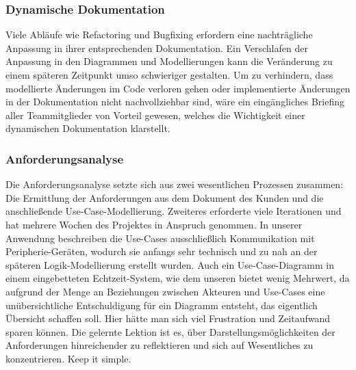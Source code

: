 \subsubsection{Dynamische Dokumentation}
Viele Abläufe wie Refactoring und Bugfixing erfordern eine nachträgliche Anpassung in ihrer entsprechenden
Dokumentation.
Ein Verschlafen der Anpassung in den Diagrammen und Modellierungen kann die Veränderung zu einem
späteren Zeitpunkt umso schwieriger gestalten.
Um zu verhindern, dass modellierte Änderungen im Code verloren gehen oder implementierte Änderungen
in der Dokumentation nicht nachvollziehbar sind, wäre ein eingängliches Briefing aller Teammitglieder von Vorteil
gewesen, welches die Wichtigkeit einer dynamischen Dokumentation klarstellt.

\subsubsection{Anforderungsanalyse}
Die Anforderungsanalyse setzte sich aus zwei wesentlichen Prozessen zusammen:
Die Ermittlung der Anforderungen aus dem Dokument des Kunden und die anschließende Use-Case-Modellierung.
Zweiteres erforderte viele Iterationen und hat mehrere Wochen des Projektes in Anspruch genommen.
In unserer Anwendung beschreiben die Use-Cases ausschließlich Kommunikation mit Peripherie-Geräten,
wodurch sie anfangs sehr technisch und zu nah an der späteren Logik-Modellierung erstellt wurden.
Auch ein Use-Case-Diagramm in einem eingebetteten Echtzeit-System, wie dem unseren bietet wenig Mehrwert,
da aufgrund der Menge an Beziehungen zwischen Akteuren und Use-Cases eine unübersichtliche Entschuldigung
für ein Diagramm entsteht, das eigentlich Übersicht schaffen soll.
Hier hätte man sich viel Frustration und Zeitaufwand sparen können.
Die gelernte Lektion ist es, über Darstellungsmöglichkeiten der Anforderungen hinreichender zu reflektieren
und sich auf Wesentliches zu konzentrieren.
Keep it simple.

